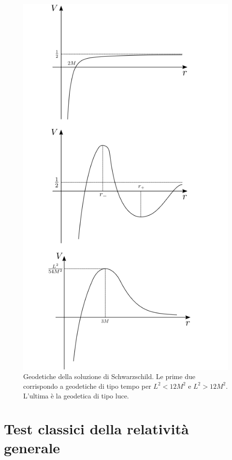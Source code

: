 \begin{figure}
    \centering
    \includegraphics[scale=0.8]{immagini/geodetiche.png}
    \caption{Geodetiche della soluzione di Schwarzschild. Le prime due corrispondo a geodetiche di tipo tempo per $L^2 <12M^2$ e $L^2>12M^2$. L'ultima è la geodetica di tipo luce.}
    \label{fig.geodetiche_schwarz}
\end{figure}
\section{Test classici della relatività generale}
